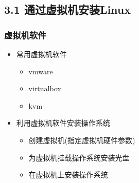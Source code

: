 \documentclass[xcolor=svgnames,bigger,presentation]{beamer}
\begin{document}
\subsection{3.1 通过虚拟机安装Linux}
\label{sec-3-1}
\begin{frame}
\frametitle{虚拟机软件}
\label{sec-3-1-1}
\begin{itemize}

\item 常用虚拟机软件
\label{sec-3-1-1-1}%
\begin{itemize}

\item vmware
\label{sec-3-1-1-1-1}%

\item virtualbox
\label{sec-3-1-1-1-2}%

\item kvm
\label{sec-3-1-1-1-3}%
\end{itemize} %

\item 利用虚拟机软件安装操作系统
\label{sec-3-1-1-2}%
\begin{itemize}

\item 创建虚拟机(指定虚拟机硬件参数)
\label{sec-3-1-1-2-1}%

\item 为虚拟机挂载操作系统安装光盘
\label{sec-3-1-1-2-2}%

\item 在虚拟机上安装操作系统
\label{sec-3-1-1-2-3}%
\end{itemize} %
\end{itemize} %
\end{frame}
\end{document}
